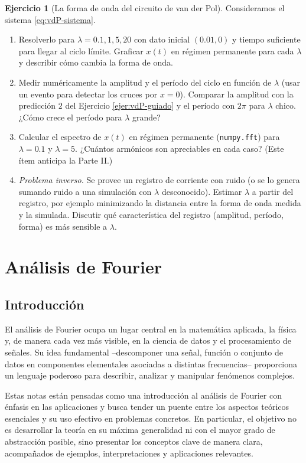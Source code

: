 \documentclass[12pt, a4paper]{amsbook}
\theoremstyle{remark}
\theoremstyle{definition}
\newtheorem{ejer}[teo]{Ejercicio}
\numberwithin{section}{chapter}
\numberwithin{subsection}{section}
\numberwithin{equation}{section}
\numberwithin{figure}{chapter}
\begin{document}
\begin{ejer}[La forma de onda del circuito de van der Pol]
Consideramos el sistema \eqref{eq:vdP-sistema}.
\begin{enumerate}
\item Resolverlo para $\lambda = 0.1, 1, 5, 20$ con dato inicial $(0.01,0)$ y tiempo suficiente para llegar al ciclo límite. Graficar $x(t)$ en régimen permanente para cada $\lambda$ y describir cómo cambia la forma de onda.
\item Medir numéricamente la amplitud y el período del ciclo en función de $\lambda$ (usar un evento para detectar los cruces por $x=0$). Comparar la amplitud con la predicción $2$ del Ejercicio \ref{ejer:vdP-guiado} y el período con $2\pi$ para $\lambda$ chico. ¿Cómo crece el período para $\lambda$ grande?
\item Calcular el espectro de $x(t)$ en régimen permanente (\lstinline{numpy.fft}) para $\lambda=0.1$ y $\lambda=5$. ¿Cuántos armónicos son apreciables en cada caso? (Este ítem anticipa la Parte II.)
\item \emph{Problema inverso.} Se provee un registro de corriente con ruido (o se lo genera sumando ruido a una simulación con $\lambda$ desconocido). Estimar $\lambda$ a partir del registro, por ejemplo minimizando la distancia entre la forma de onda medida y la simulada. Discutir qué característica del registro (amplitud, período, forma) es más sensible a $\lambda$.
\end{enumerate}
\end{ejer}


\part{Análisis de Fourier}
\chapter{Introducción}\label{cap:intro-II}

El análisis de Fourier ocupa un lugar central en la matemática aplicada, la física y, de manera cada vez más visible, en la ciencia de datos y el procesamiento de señales. Su idea fundamental --descomponer una señal, función o conjunto de datos en componentes elementales asociadas a distintas frecuencias-- proporciona un lenguaje poderoso para describir, analizar y manipular fenómenos complejos.

Estas notas están pensadas como una introducción al análisis de Fourier con énfasis en las aplicaciones y busca tender un puente entre los aspectos teóricos esenciales y su uso efectivo en problemas concretos. En particular, el objetivo no es desarrollar la teoría en su máxima generalidad ni con el mayor grado de abstracción posible, sino presentar los conceptos clave de manera clara, acompañados de ejemplos, interpretaciones y aplicaciones relevantes.
\end{document}

